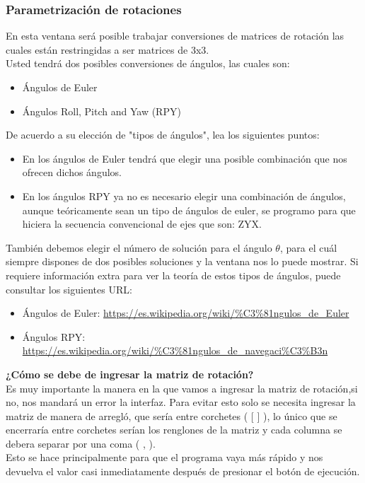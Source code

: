 \documentclass[12pt]{article}
\begin{document}
\subsubsection{Parametrización de rotaciones}
En esta ventana será posible trabajar conversiones de matrices de rotación las cuales están restringidas a ser matrices de 3x3.\\
Usted tendrá dos posibles conversiones de ángulos, las cuales son:
\begin{itemize}
	\item Ángulos de Euler
	\item Ángulos Roll, Pitch and Yaw (RPY)
\end{itemize}
De acuerdo a su elección de "tipos de ángulos", lea los siguientes puntos:
\begin{itemize}
	\item En los ángulos de Euler tendrá que elegir una posible combinación que nos ofrecen dichos ángulos.
	\item En los ángulos RPY ya no es necesario elegir una combinación de ángulos, aunque teóricamente sean un tipo de ángulos de euler, se programo para que hiciera la secuencia convencional de ejes que son: ZYX.
\end{itemize}
También debemos elegir el número de solución para el ángulo $\theta$, para el cuál siempre dispones de dos posibles soluciones y la ventana nos lo puede mostrar.
Si requiere información extra para ver la teoría de estos tipos de ángulos, puede consultar los siguientes URL:
\begin{itemize}
	\item Ángulos de Euler: \small \url{https://es.wikipedia.org/wiki/%C3%81ngulos_de_Euler}
	\item Ángulos RPY: \small \url{https://es.wikipedia.org/wiki/%C3%81ngulos_de_navegaci%C3%B3n}
\end{itemize}
\textbf{¿Cómo se debe de ingresar la matriz de rotación?}\\
Es muy importante la manera en la que vamos a ingresar la matriz de rotación,si no, nos mandará un error la interfaz. Para evitar esto solo se necesita ingresar la matriz de manera de arregló, que sería entre corchetes ( [ ] ), lo único que se encerraría entre corchetes serían los renglones de la matriz y cada columna se debera separar por una coma ( , ).\\
Esto se hace principalmente para que el programa vaya más rápido y nos devuelva el valor casi inmediatamente después de presionar el botón de ejecución.\\
\end{document}
